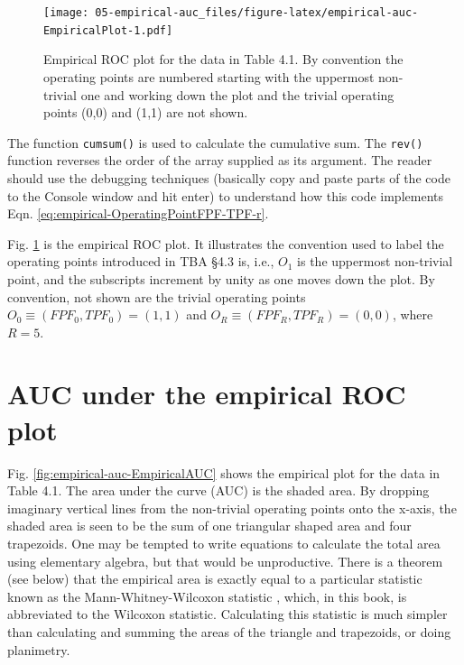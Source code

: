 \documentclass[
]{book}
\begin{document}
\begin{figure}
\centering
\texttt{[image: 05-empirical-auc\_files/figure-latex/empirical-auc-EmpiricalPlot-1.pdf]}
\caption{\label{fig:empirical-auc-EmpiricalPlot}Empirical ROC plot for the data in Table 4.1. By convention the operating points are numbered starting with the uppermost non-trivial one and working down the plot and the trivial operating points (0,0) and (1,1) are not shown.}
\end{figure}

The function \texttt{cumsum()} is used to calculate the cumulative sum. The \texttt{rev()} function reverses the order of the array supplied as its argument. The reader should use the debugging techniques (basically copy and paste parts of the code to the Console window and hit enter) to understand how this code implements Eqn. \eqref{eq:empirical-OperatingPointFPF-TPF-r}.

Fig. \ref{fig:empirical-auc-EmpiricalPlot} is the empirical ROC plot. It illustrates the convention used to label the operating points introduced in TBA §4.3 is, i.e., \(O_1\) is the uppermost non-trivial point, and the subscripts increment by unity as one moves down the plot. By convention, not shown are the trivial operating points \(O_0 \equiv (FPF_0, TPF_0) = (1,1)\) and \(O_R \equiv (FPF_R, TPF_R) = (0,0)\), where \(R = 5\).

\hypertarget{empirical-auc-area-under}{%
\section{AUC under the empirical ROC plot}\label{empirical-auc-area-under}}

Fig. \ref{fig:empirical-auc-EmpiricalAUC} shows the empirical plot for the data in Table 4.1. The area under the curve (AUC) is the shaded area. By dropping imaginary vertical lines from the non-trivial operating points onto the x-axis, the shaded area is seen to be the sum of one triangular shaped area and four trapezoids. One may be tempted to write equations to calculate the total area using elementary algebra, but that would be unproductive. There is a theorem (see below) that the empirical area is exactly equal to a particular statistic known as the Mann-Whitney-Wilcoxon statistic \citep{RN2191, RN2197}, which, in this book, is abbreviated to the Wilcoxon statistic. Calculating this statistic is much simpler than calculating and summing the areas of the triangle and trapezoids, or doing planimetry.
\end{document}
